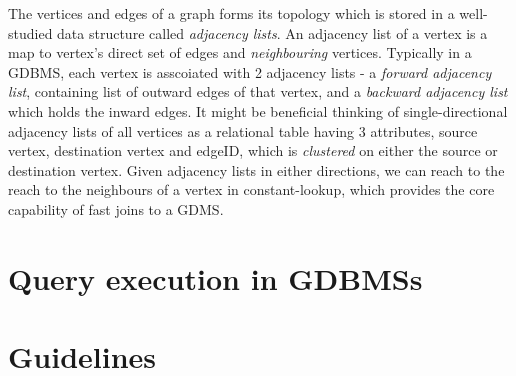 The vertices and edges of a graph forms its topology which is stored in a well-studied data structure called \emph{adjacency lists}. An adjacency list of a vertex is a map to vertex's direct set of edges and \emph{neighbouring} vertices. Typically in a GDBMS, each vertex is asscoiated with 2 adjacency lists - a \emph{forward adjacency list}, containing list of outward edges of that vertex, and a \emph{backward adjacency list} which holds the inward edges. It might be beneficial thinking of single-directional adjacency lists of all vertices as a relational table having 3 attributes, source vertex, destination vertex and edgeID, which is \emph{clustered} on either the source or destination vertex. Given adjacency lists in either directions, we can reach to the reach to the neighbours of a vertex in constant-lookup, which provides the core capability of fast joins to a GDMS. 





\section{Query execution in GDBMSs}
\label{sec:operators}

\section{Guidelines}
\label{sec:guidelines}



